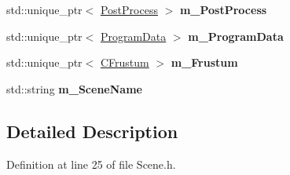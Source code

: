 \begin{DoxyCompactItemize}
\item 
std\+::unique\+\_\+ptr$<$ \hyperlink{class_post_process}{Post\+Process} $>$ {\bfseries m\+\_\+\+Post\+Process}\hypertarget{class_scene_a206acc18a7bc9f233c6f5bdde336f278}{}\label{class_scene_a206acc18a7bc9f233c6f5bdde336f278}

\item 
std\+::unique\+\_\+ptr$<$ \hyperlink{class_program_data}{Program\+Data} $>$ {\bfseries m\+\_\+\+Program\+Data}\hypertarget{class_scene_ae8d89e6c1a5c06cacea5e733dcf46207}{}\label{class_scene_ae8d89e6c1a5c06cacea5e733dcf46207}

\item 
std\+::unique\+\_\+ptr$<$ \hyperlink{class_c_frustum}{C\+Frustum} $>$ {\bfseries m\+\_\+\+Frustum}\hypertarget{class_scene_a8252214e11f2be643515899a52f9dc11}{}\label{class_scene_a8252214e11f2be643515899a52f9dc11}

\item 
std\+::string {\bfseries m\+\_\+\+Scene\+Name}\hypertarget{class_scene_a7ba4770364d9e1bfe7f450ddbe8d3e77}{}\label{class_scene_a7ba4770364d9e1bfe7f450ddbe8d3e77}

\end{DoxyCompactItemize}


\subsection{Detailed Description}


Definition at line 25 of file Scene.\+h.

